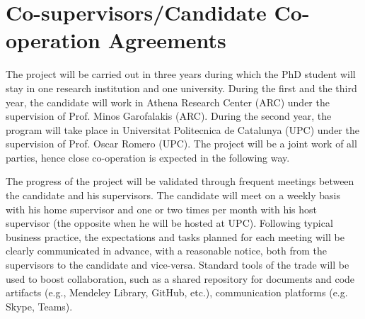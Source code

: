 \documentclass[12pt]{article}
\begin{document}







\section{Co-supervisors/Candidate Co-operation Agreements}
The project will be carried out in three years during which the PhD student will stay in one research institution and one university. During the first and the third year, the candidate will work in Athena Research Center (ARC) under the supervision of Prof. Minos Garofalakis (ARC). During the second year, the program
will take place in Universitat Politecnica de Catalunya (UPC) under the supervision of Prof. Oscar Romero (UPC). The project will be a joint work of all parties, hence close co-operation is expected in the following way.

The progress of the project will be validated through frequent meetings between the candidate and his supervisors. The candidate will meet on a weekly basis with his home supervisor and one or two times per month with his host supervisor (the opposite when he will be hosted at UPC). Following typical business practice, the expectations and tasks planned for each meeting will be clearly communicated in advance, with a reasonable notice, both from the supervisors to the candidate and vice-versa. Standard tools of the trade will be used to boost collaboration, such
as a shared repository for documents and code artifacts (e.g., Mendeley Library, GitHub, etc.), communication platforms (e.g. Skype, Teams).
\end{document}
